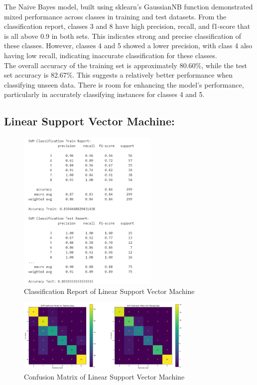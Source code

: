 \documentclass[11pt, letterpaper]{article}
\begin{document}
    \noindent The Naive Bayes model, built using sklearn’s GaussianNB function demonstrated mixed performance across classes in training and test datasets. From the classification report, classes 3 and 8 have high precision, recall, and f1-score that is all above 0.9 in both sets. This indicates strong and precise classification of these classes. However, classes 4 and 5 showed a lower precision, with class 4 also having low recall, indicating inaccurate classification for these classes.\\
    
    \noindent The overall accuracy of the training set is approximately 80.60\%, while the test set accuracy is 82.67\%. This suggests a relatively better performance when classifying unseen data. There is room for enhancing the model’s performance, particularly in accurately classifying instances for classes 4 and 5.
    
    \noindent\subsection*{Linear Support Vector Machine:}

    \begin{figure}[H]
        \centering
        \includegraphics[width=0.60\textwidth]{svm-classification-report.png}
        \caption{Classification Report of Linear Support Vector Machine}
        \label{fig:class-report-svm}
    \end{figure}

    \begin{figure}[H]
        \centering
        \includegraphics[width=0.75\textwidth]{svm-confusion-matrix.png}
        \caption{Confusion Matrix of Linear Support Vector Machine}
        \label{fig:confusion-matrix-svm}
    \end{figure}
\end{document}
